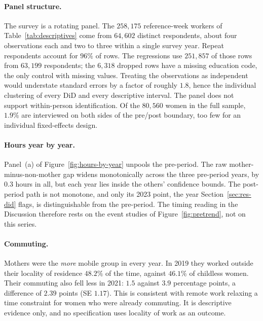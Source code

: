 \paragraph{Panel structure.}
The survey is a rotating panel. The $258{,}175$ reference-week workers of
Table~\ref{tab:descriptives} come from $64{,}602$ distinct respondents, about four observations
each and two to three within a single survey year. Repeat respondents account for $96\%$ of
rows. The regressions use $251{,}857$ of those rows from $63{,}199$ respondents; the $6{,}318$
dropped rows have a missing education code, the only control with missing values. Treating the
observations as independent would understate standard errors by a factor of roughly $1.8$, hence
the individual clustering of every DiD and every descriptive interval. The panel does not
support within-person identification. Of the $80{,}560$ women in the full sample, $1.9\%$ are
interviewed on both sides of the pre/post boundary, too few for an individual fixed-effects
design.

\paragraph{Hours year by year.}
Panel~(a) of Figure~\ref{fig:hours-by-year} unpools the pre-period. The raw mother-minus-non-mother
gap widens monotonically across the three pre-period years, by $0.3$ hours in all, but each year
lies inside the others' confidence bounds. The post-period path is not monotone, and only its
2023 point, the year Section~\ref{sec:res-did} flags, is distinguishable from the pre-period.
The timing reading in the Discussion therefore rests on the event studies of
Figure~\ref{fig:pretrend}, not on this series.

\paragraph{Commuting.}
Mothers were the \emph{more} mobile group in every year. In 2019 they worked outside their
locality of residence $48.2\%$ of the time, against $46.1\%$ of childless women. Their commuting
also fell less in 2021: $1.5$ against $3.9$ percentage points, a difference of $2.39$ points
(SE $1.17$). This is consistent with remote work relaxing a time constraint for women who were
already commuting. It is descriptive evidence only, and no specification uses locality of work as
an outcome.

